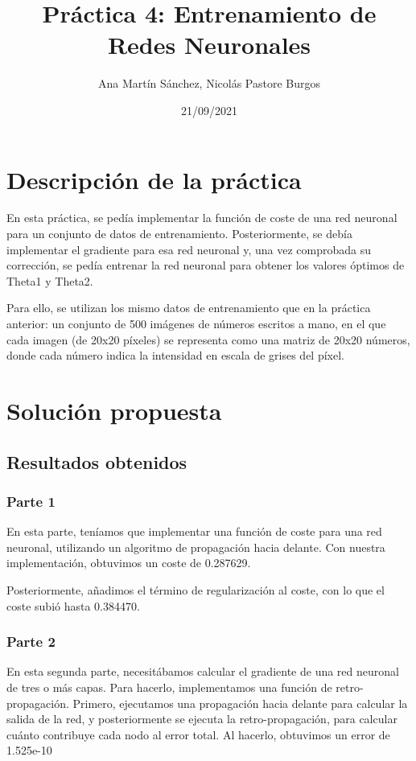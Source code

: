 \documentclass[11pt]{article}
\title{Práctica 4: Entrenamiento de Redes Neuronales}
\author{Ana Martín Sánchez, Nicolás Pastore Burgos}
\date{21/09/2021}
\begin{document}
\maketitle

\section{Descripción de la práctica}

 En esta práctica, se pedía implementar la función de coste de una red neuronal para un conjunto de datos de entrenamiento. Posteriormente, se debía implementar el gradiente para esa red neuronal y, una vez comprobada su corrección, se pedía entrenar la red neuronal para obtener los valores óptimos de Theta1 y Theta2.
 
 Para ello, se utilizan los mismo datos de entrenamiento que en la práctica anterior: un conjunto de 500 imágenes de números escritos a mano, en el que cada imagen (de 20x20 píxeles) se representa como una matriz de 20x20 números, donde cada número indica la intensidad en escala de grises del píxel.

\section{Solución propuesta}

\subsection{Resultados obtenidos}

\subsubsection {Parte 1}

 En esta parte, teníamos que implementar una función de coste para una red neuronal, utilizando un algoritmo de propagación hacia delante. Con nuestra implementación, obtuvimos un coste de 0.287629.

Posteriormente, añadimos el término de regularización al coste, con lo que el coste subió hasta 0.384470.


\subsubsection {Parte 2}

 En esta segunda parte, necesitábamos calcular el gradiente de una red neuronal de tres o más capas. Para hacerlo, implementamos una función de retro-propagación. Primero, ejecutamos una propagación hacia delante para calcular la salida de la red, y posteriormente se ejecuta la retro-propagación, para calcular cuánto contribuye cada nodo al error total. Al hacerlo, obtuvimos un error de 1.525e-10
\end{document}

